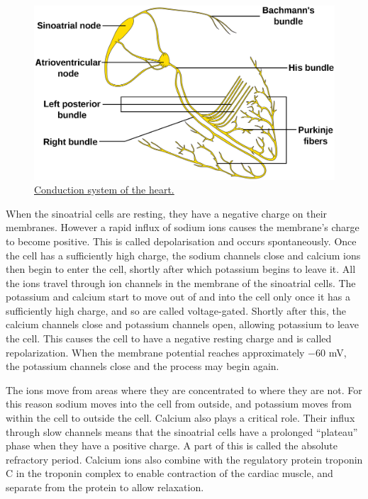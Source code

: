 \begin{figure}

{\centering \includegraphics[width=0.7\linewidth]{./figures/circulation/ConductionsystemoftheheartwithouttheHeart-en} 

}

\caption{\href{https://commons.wikimedia.org/wiki/File:ConductionsystemoftheheartwithouttheHeart-en.svg}{Conduction system of the heart.}}\label{fig:conductionsystem}
\end{figure}

When the sinoatrial cells are resting, they have a negative charge on their membranes. However a rapid influx of sodium ions causes the membrane's charge to become positive. This is called depolarisation and occurs spontaneously. Once the cell has a sufficiently high charge, the sodium channels close and calcium ions then begin to enter the cell, shortly after which potassium begins to leave it. All the ions travel through ion channels in the membrane of the sinoatrial cells. The potassium and calcium start to move out of and into the cell only once it has a sufficiently high charge, and so are called voltage-gated. Shortly after this, the calcium channels close and potassium channels open, allowing potassium to leave the cell. This causes the cell to have a negative resting charge and is called repolarization. When the membrane potential reaches approximately −60 mV, the potassium channels close and the process may begin again.

The ions move from areas where they are concentrated to where they are not. For this reason sodium moves into the cell from outside, and potassium moves from within the cell to outside the cell. Calcium also plays a critical role. Their influx through slow channels means that the sinoatrial cells have a prolonged ``plateau'' phase when they have a positive charge. A part of this is called the absolute refractory period. Calcium ions also combine with the regulatory protein troponin C in the troponin complex to enable contraction of the cardiac muscle, and separate from the protein to allow relaxation.

